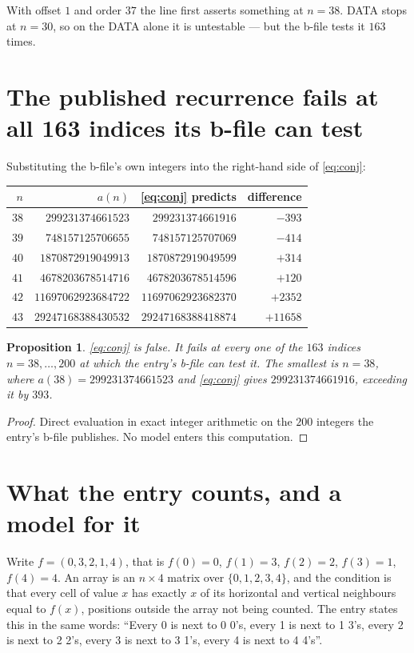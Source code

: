 \documentclass[11pt,a4paper]{article}
\theoremstyle{plain}
\newtheorem{proposition}[theorem]{Proposition}
\theoremstyle{definition}
\begin{document}
With offset $1$ and order $37$ the line first asserts something at $n=38$. DATA stops at
$n=30$, so on the DATA alone it is untestable --- but the b-file tests it $163$ times.

\section{The published recurrence fails at all 163 indices its b-file can test}

Substituting the b-file's own integers into the right-hand side of \eqref{eq:conj}:

\begin{center}\small
\begin{tabular}{rrrr}
\toprule
$n$ & $a(n)$ & \eqref{eq:conj} predicts & difference \\
\midrule
$38$ & $299231374661523$ & $299231374661916$ & $-393$\\
$39$ & $748157125706655$ & $748157125707069$ & $-414$\\
$40$ & $1870872919049913$ & $1870872919049599$ & $+314$\\
$41$ & $4678203678514716$ & $4678203678514596$ & $+120$\\
$42$ & $11697062923684722$ & $11697062923682370$ & $+2352$\\
$43$ & $29247168388430532$ & $29247168388418874$ & $+11658$\\
\bottomrule
\end{tabular}
\end{center}

\begin{proposition}\label{prop:false}
\eqref{eq:conj} is false. It fails at every one of the $163$ indices $n=38,\dots,200$ at
which the entry's b-file can test it. The smallest is $n=38$, where
$a(38)=299231374661523$ and \eqref{eq:conj} gives $299231374661916$, exceeding it by $393$.
\end{proposition}

\begin{proof}
Direct evaluation in exact integer arithmetic on the $200$ integers the entry's b-file
publishes. No model enters this computation.
\end{proof}

\section{What the entry counts, and a model for it}

Write $f=(0,3,2,1,4)$, that is $f(0)=0$, $f(1)=3$, $f(2)=2$, $f(3)=1$, $f(4)=4$. An array is
an $n\times4$ matrix over $\{0,1,2,3,4\}$, and the condition is that every cell of value $x$
has exactly $x$ of its horizontal and vertical neighbours equal to $f(x)$, positions outside
the array not being counted. The entry states this in the same words:
``Every 0 is next to 0 0's, every 1 is next to 1 3's, every 2 is next to 2 2's, every 3 is
next to 3 1's, every 4 is next to 4 4's''.
\end{document}
